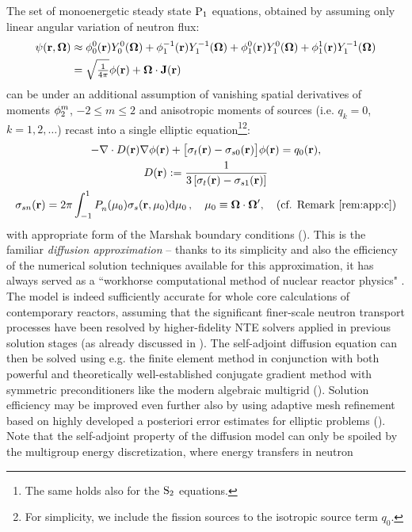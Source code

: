 The set of monoenergetic steady state $\PN[1]$ equations, obtained by assuming only linear angular variation of neutron
flux:
$$
\begin{aligned}
	\psi(\br,\bomega) &\approx \angmom{0}{0}(\br)\Y{0}{0}(\bomega) + \angmom{1}{-1}(\br)\Y{1}{-1}(\bomega)
	+ \angmom{1}{0}(\br)\Y{1}{0}(\bomega) + \angmom{1}{1}(\br)\Y{1}{-1}(\bomega)\\
	&= \sqrt{\tfrac{1}{4\pi}}\phi(\br) + \bomega\cdot \bJ(\br)
\end{aligned}
$$
can be under an additional assumption of vanishing spatial derivatives of moments $\angmom{2}{m}$, $-2 \leq m \leq
2$ and anisotropic moments of sources (i.e. $q_{k} = 0$, $k = 1,2,\ldots$)  
recast into a single elliptic equation\footnote{The same holds also for the $\SN[2]$ equations.}\footnote{For
simplicity, we include the fission sources to the isotropic source term $q_0$.}:
$$
\begin{gathered}
	-\nabla\cdot D(\br) \nabla\phi(\br) + \bigl[\sigma_t(\br) - \sigma_{s0}(\br)\bigr]\phi(\br) = q_0(\br),\\
	D(\br) := \frac{1}{3\left[\sigma_t(\br) - \sigma_{s1}(\br)\right]}\\
	\sigma_{sn}(\br) = 2\pi \muint[_0]{\P{n}{}(\mu_0)\sigma_s(\br,\mu_0)},\quad \mu_0 \equiv \bomega\cdot\bomega',\quad
	\mbox{(cf.
	Remark
	\ref{rem:app:c})}
\end{gathered}	
$$
with appropriate form of the Marshak boundary conditions (\cite{Stacey1,Reuss1}).
This is the familiar \textit{diffusion approximation} -- thanks to its simplicity and also the efficiency of the 
numerical solution techniques available for this approximation, it has always served as a ``workhorse computational 
method of nuclear reactor physics" \cite[p. 43]{Stacey1}. The model is indeed sufficiently accurate for whole core 
calculations of contemporary reactors, assuming that the significant finer-scale neutron transport processes have been 
resolved by higher-fidelity NTE solvers applied in previous solution stages (as already discussed in ).
The self-adjoint diffusion equation can then be solved using e.g. the finite element method in conjunction with both
powerful and theoretically well-established conjugate gradient method with symmetric preconditioners like the modern
algebraic multigrid (\cite{vanek1,vanek2}). Solution efficiency may be improved even further also by using adaptive mesh
refinement based on highly developed a posteriori error estimates for elliptic problems (\cite{adaptive}). Note that the
self-adjoint property of the diffusion model can only be spoiled by the multigroup energy discretization, where energy transfers in neutron
